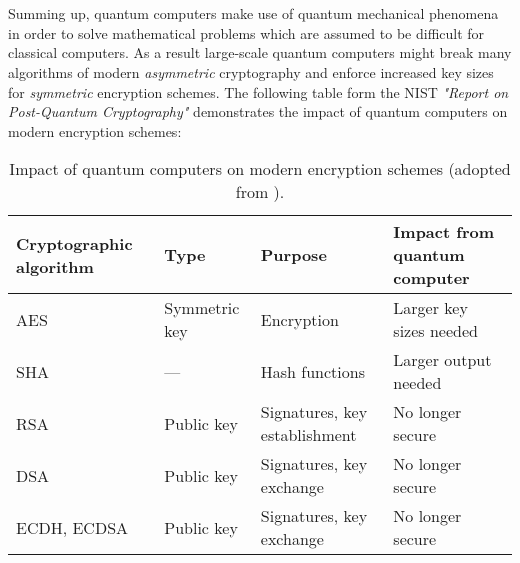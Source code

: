 \\\\
Summing up, quantum computers make use of quantum mechanical phenomena in order to solve mathematical problems which are assumed to be difficult for classical computers. As a result large-scale quantum computers might break many algorithms of modern \textit{asymmetric} cryptography and enforce increased key sizes for \textit{symmetric} encryption schemes. The following table form the \gls{NIST} \textit{"Report on Post-Quantum Cryptography"} \parencite{chen2016report} demonstrates the impact of quantum computers on modern encryption schemes:

\begin{table}[H]
  \centering
  \begin{tabular}{|K{3cm}|K{3cm}|K{4cm}|K{4cm}|}
	\hline
      \textbf{Cryptographic} \textbf{algorithm} & \textbf{Type} & \textbf{Purpose} & \textbf{Impact from} \textbf{ quantum computer} \\
	\hline
      \gls{AES} & Symmetric key & Encryption & Larger key sizes needed \\
    \hline
      \gls{SHA} & --- & Hash functions & Larger output needed \\
    \hline
      \gls{RSA} & Public key & Signatures, key establishment & No longer secure \\
	\hline      
      \gls{DSA} & Public key & Signatures, key exchange & No longer secure \\
    \hline
      \gls{ECDH}, \gls{ECDSA} & Public key & Signatures, key exchange & No longer secure \\
    \hline
  \end{tabular}
  \caption[Impact of quantum computers on modern encryption schemes]{Impact of quantum computers on modern encryption schemes (adopted from \parencite{chen2016report}).}\label{tab:impact}
\end{table}

